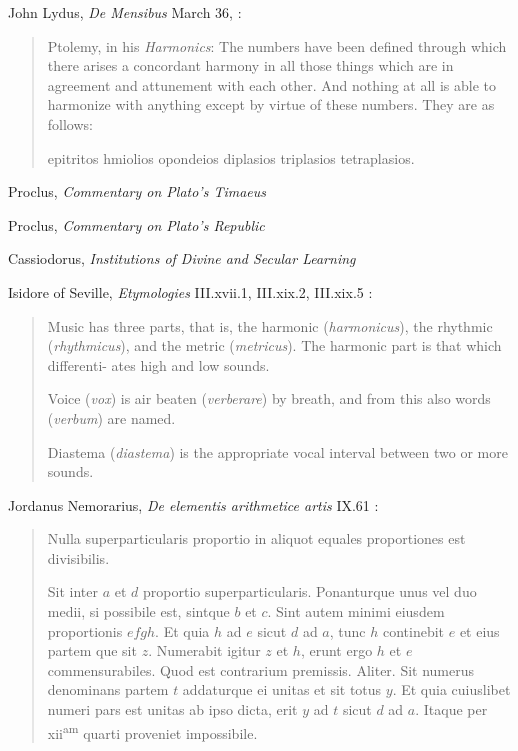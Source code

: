 \documentclass{article}
\newcommand{\textgreek}[1]{\begingroup\fontencoding{LGR}\selectfont#1\endgroup}
\theoremstyle{definition}
\begin{document}
John Lydus, {\em De Mensibus} March 36, \cite[p.~94]{lydus}:

\begin{quote}
Ptolemy, in his {\em Harmonics}: The numbers have been defined through which there arises a concordant harmony in all those things which are in agreement and attunement with each other. And nothing at all is able to harmonize with anything except by virtue of these numbers. They are as follows:

\textgreek{epitritos hmiolios opondeios diplasios triplasios tetraplasios}.
\end{quote}

Proclus, {\em Commentary on Plato's Timaeus} \cite{timaeum3II}

Proclus, {\em Commentary on Plato's Republic} \cite{festugiereII}

Cassiodorus, {\em Institutions of Divine and Secular Learning} \cite{cassiodorus}

Isidore of Seville, {\em Etymologies} III.xvii.1, III.xix.2, III.xix.5 \cite[p.~96]{isidore}:

\begin{quote}
Music has three parts, that is, the harmonic ({\em harmonicus}), the rhythmic ({\em rhythmicus}), and the metric ({\em metricus}). The harmonic part is that which differenti- ates high and low sounds.

Voice ({\em vox}) is air beaten ({\em verberare}) by breath, and from this also words ({\em verbum}) are named.

Diastema ({\em diastema}) is the appropriate vocal interval between two or more sounds. 
\end{quote}

Jordanus Nemorarius, {\em De elementis arithmetice artis} IX.61 \cite[pp.~193--194]{jordanus}:

\begin{quote}
Nulla superparticularis proportio in aliquot equales proportiones est
divisibilis.

Sit inter $a$ et $d$ proportio superparticularis. Ponanturque unus vel duo medii, si
possibile est, sintque $b$ et $c$. Sint autem minimi eiusdem proportionis $e f g h$. Et
quia $h$ ad $e$ sicut $d$ ad $a$, tunc $h$ continebit $e$ et eius partem que sit $z$. Numerabit
igitur $z$ et $h$, erunt ergo $h$ et $e$ commensurabiles. Quod est contrarium premissis.
Aliter. Sit numerus denominans partem $t$ addaturque ei unitas et sit totus $y$. Et
quia cuiuslibet numeri pars est unitas ab ipso dicta, erit $y$ ad $t$ sicut $d$ ad $a$. Itaque
per xii\textsuperscript{am} quarti proveniet impossibile.
\end{quote}
\end{document}
